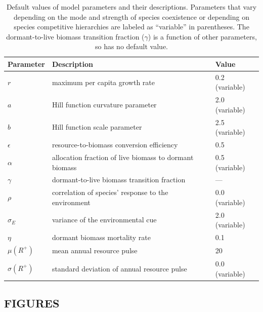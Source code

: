 \documentclass[12pt,]{article}
\begin{document}
\begin{table}[!htbp]
\caption{Default values of model parameters and their descriptions. Parameters that vary depending on the mode and strength of species coexistence or depending on species competitive hierarchies are labeled as ``variable'' in parentheses. The dormant-to-live biomass transition fraction ($\gamma$) is a function of other parameters, so has no default value.}
\begin{tabular}{l l l}
\hline
Parameter & Description & Value \\
\hline
$r$ & maximum per capita growth rate & 0.2 (variable) \\
$a$ & Hill function curvature parameter & 2.0 (variable) \\
$b$ & Hill function scale parameter & 2.5 (variable) \\
$\epsilon$ & resource-to-biomass conversion efficiency & 0.5 \\
$\alpha$ & allocation fraction of live biomass to dormant biomass & 0.5 (variable) \\
$\gamma$ & dormant-to-live biomass transition fraction & --- \\
$\rho$ & correlation of species' response to the environment & 0.0 (variable) \\
$\sigma_E$ & variance of the environmental cue & 2.0 (variable) \\
$\eta$ & dormant biomass mortality rate & 0.1 \\
$\mu(R^+)$ & mean annual resource pulse & 20 \\
$\sigma(R^+)$ & standard deviation of annual resource pulse & 0.0 (variable) \\
\hline
\end{tabular}
\end{table}

\newpage{}

\subsection{FIGURES}\label{figures}
\end{document}
